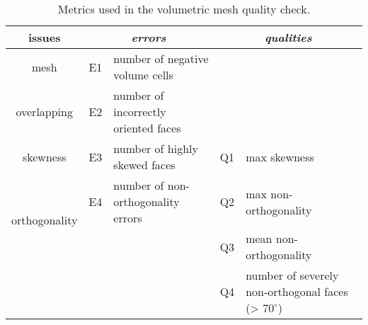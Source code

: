 \begin{table}[!htbp]
  \centering
  \caption{\small Metrics used in the volumetric mesh quality check.}
    \begin{tabular}{crrrp{}}
    \hline
    \hline
    \textbf{issues} & \multicolumn{2}{c}{\textit{\textbf{errors}}} & \multicolumn{2}{c}{\textit{\textbf{qualities}}} \\
    \hline
    mesh   & \multicolumn{1}{l}{E1} & \multicolumn{1}{l}{number of negative volume cells} &        &  \\
    overlapping & \multicolumn{1}{l}{E2} & \multicolumn{1}{l}{number of incorrectly oriented faces} &        &  \\
    \hline
    skewness & \multicolumn{1}{l}{E3} & \multicolumn{1}{l}{number of highly skewed faces} & \multicolumn{1}{l}{Q1} & max skewness \\
    \hline
    \multirow{2}[2]{*}{orthogonality} & \multicolumn{1}{l}{E4} & \multicolumn{1}{l}{number of non-orthogonality errors} & \multicolumn{1}{l}{Q2} & max non-orthogonality \\
           &        &        & \multicolumn{1}{l}{Q3} & mean non-orthogonality \\
           &        &        & \multicolumn{1}{l}{Q4} & number of severely non-orthogonal faces  (> $70^\circ$)\\
    \hline
    \hline
    \end{tabular}%
    \label{ch3:tab:mesh_check_notions}
\end{table}%